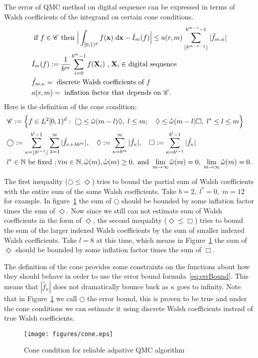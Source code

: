 The error of QMC method on digital sequence can be expressed in terms of Walsh coefficients of the integrand on certain cone conditions. 
\begin{align}
    \label{eq:errBound}
    &\text{ if } f \in \mathscr{C}\text{ then } \Big|\int_{[0,1)^d}f(\mathbf{x})\;\textrm{d}\mathbf{x} - \hat{I}_m(f)\Big| \leq a(r,m) \sum_{\lfloor b^{m-r-1} \rfloor}^{b^{m-r}-1} |\tilde{f}_{m,\kappa}|\\
    &\hat{I}_m(f): = \frac{1}{b^m}\sum_{i=0}^{b^m-1}f(\mathbf{X}_i)
    \text{ ,$\;\mathbf{X}_i\in$ digital sequence}\notag\\
    &\tilde{f}_{m,\kappa}=\text{ discrete Walsh coefficients of }f \notag\\
    &a(r,m) =\text{ inflation factor that depends on } \mathscr{C} \notag.
\end{align}
Here is the definition of the cone condition:
\begin{align}
   &\mathscr{C}:=\Big\{f\in L^2[0,1)^d:\;\bigcirc \leq \hat{\omega}(m-l)\Diamond,\; l\leq m;\quad
   \Diamond \leq \mathring{\omega}(m-l) \Box, 
   \; l^*\leq l \leq m\Big\}\notag\\
   \label{eq:cone}
   &\bigcirc:= \sum_{\kappa=\lfloor b^{l-1} \rfloor}^{b^l-1} \sum_{\lambda=1}^{\infty}| \hat{f}_{\kappa+\lambda b^m}|,\quad  
   \Diamond:=\sum_{\kappa=b^m}^{\infty}|\hat{f}_{\kappa}|,\quad
   \Box:= \sum_{\kappa=b^{l-1}}^{b^l-1}|\hat{f}_\kappa|\\
   &l^*\in \mathbb{N}\text{ be fixed }; \forall m\in \mathbb{N},\hat{\omega}(m),\mathring{\omega}(m)\geq 0, \text{ and } \lim_{m\to \infty} \hat{\omega}(m)=0,\; \lim_{m\to \infty} \mathring{\omega}(m)=0\notag.
\end{align}

The first inequality ($\bigcirc \leq \Diamond$) tries to bound the partial sum of Walsh coefficients with the entire sum of the same Walsh coefficients. 
Take $b=2,\; l^*=0,\; m=12$ for example. 
In figure~\ref{fg:cone} the sum of $\bigcirc$ should be bounded by some inflation factor times the sum of $\Diamond$. 
Now since we still can not estimate sum of Walsh coefficients in the form of $\Diamond$, the second inequality ($\Diamond\leq \Box$) tries to bound the sum of the larger indexed Walsh coefficients by the sum of smaller indexed Walsh coefficients. 
Take $l=8$ at this time, which means in Figure~\ref{fg:cone} the sum of $\Diamond$ should be bounded by some inflation factor times the sum of $\Box$.

The definition of the cone provides some constraints on the functions about how they should behave in order to use the error bound formula~\eqref{eq:errBound}. 
This means that $|\hat{f}_\kappa|$ does not dramatically bounce back as $\kappa$ goes to infinity. 
Note that in Figure~\ref{fg:cone} we call $\bigcirc$ the error bound, this is proven to be true and under the cone conditions we can estimate it using discrete Walsh coefficients instead of true Walsh coefficients.
\begin{figure}[h]
    \centering
    \texttt{[image: figures/cone.eps]}
    \caption{Cone condition for reliable adpative QMC algorithm}
    \label{fg:cone}
\end{figure}
